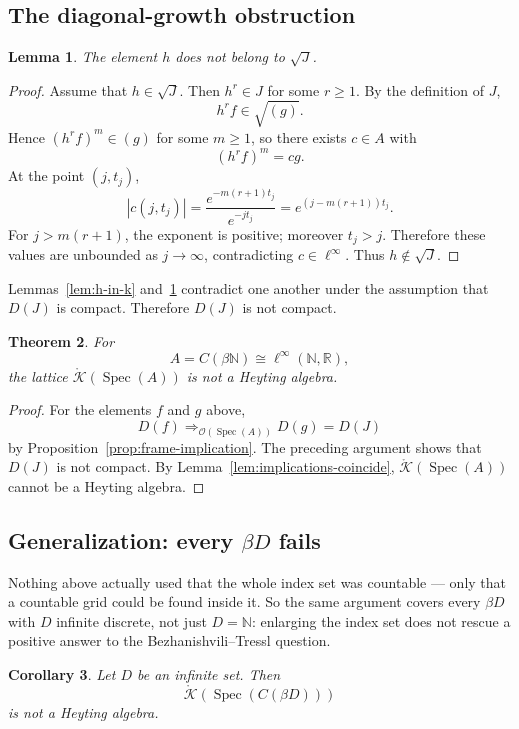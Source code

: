 \documentclass{amsart}
\newtheorem{theorem}{Theorem}
\newtheorem{lemma}[theorem]{Lemma}
\newtheorem{corollary}[theorem]{Corollary}
\theoremstyle{definition}
\theoremstyle{remark}
\newcommand{\Spec}[1]{\operatorname{Spec}\left(#1\right)}
\newcommand{\nat}{\mathbb N}
\newcommand{\reals}{\mathbb R}
\newcommand{\Op}[1]{\mathcal{O}\left(#1\right)}
\newcommand{\cont}[1]{C\left(#1\right)}
\newcommand{\KOp}[1]{\mathring{\mathcal{K}}\left(#1\right)}
\newcommand{\linfty}{\ell^\infty}
\begin{document}
\subsection{The diagonal-growth obstruction}

\begin{lemma}\label{lem:h-not-radJ}
The element $h$ does not belong to $\sqrt J$.
\end{lemma}

\begin{proof}
Assume that $h\in\sqrt J$. Then $h^r\in J$ for some $r\geq1$. By the
definition of $J$,
\[
h^rf\in\sqrt{(g)}.
\]
Hence $(h^rf)^m\in(g)$ for some $m\geq1$, so there exists $c\in A$ with
\[
(h^rf)^m=cg.
\]
At the point $(j,t_j)$,
\[
|c(j,t_j)|
=
\frac{e^{-m(r+1)t_j}}{e^{-jt_j}}
=
e^{(j-m(r+1))t_j}.
\]
For $j>m(r+1)$, the exponent is positive; moreover $t_j>j$. Therefore
these values are unbounded as $j\to\infty$, contradicting $c\in\linfty$.
Thus $h\notin\sqrt J$.
\end{proof}

Lemmas~\ref{lem:h-in-k} and~\ref{lem:h-not-radJ} contradict one another under
the assumption that $D(J)$ is compact. Therefore $D(J)$ is not compact.

\begin{theorem}\label{claim:negative-answer}
For
\[
A=\cont{\beta\nat}\cong\linfty(\nat,\reals),
\]
the lattice $\KOp{\Spec{A}}$ is not a Heyting algebra.
\end{theorem}

\begin{proof}
For the elements $f$ and $g$ above,
\[
D(f)\Rightarrow_{\Op{\Spec{A}}}D(g)=D(J)
\]
by Proposition~\ref{prop:frame-implication}. The preceding argument shows
that $D(J)$ is not compact. By Lemma~\ref{lem:implications-coincide},
$\KOp{\Spec{A}}$ cannot be a Heyting algebra.
\end{proof}

\subsection{Generalization: every \(\beta D\) fails}

Nothing above actually used that the whole index set was countable ---
only that a countable grid could be found inside it. So the same
argument covers every $\beta D$ with $D$ infinite discrete, not just
$D=\nat$: enlarging the index set does not rescue a positive answer to
the Bezhanishvili--Tressl question.

\begin{corollary}\label{cor:beta-D}
Let $D$ be an infinite set. Then
\[
\KOp{\Spec{\cont{\beta D}}}
\]
is not a Heyting algebra.
\end{corollary}
\end{document}
